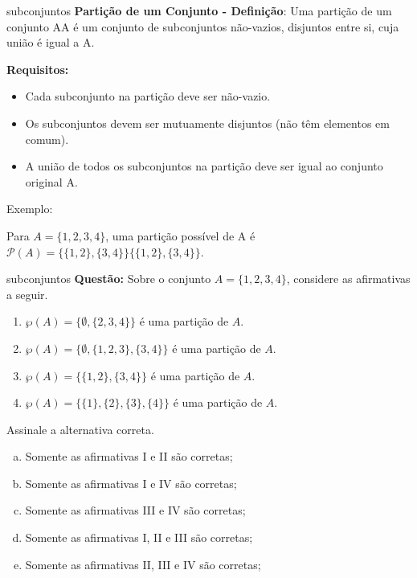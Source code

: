 \documentclass[aspectratio=169]{beamer}
\begin{document}
\begin{frame}{subconjuntos}
    \textbf{Partição de um Conjunto - Definição}: Uma partição de um conjunto AA é um conjunto de subconjuntos não-vazios, disjuntos entre si, cuja união é igual a A.
    
    \vspace{4mm}
    \textbf{Requisitos:}

    \begin{itemize}
        \item Cada subconjunto na partição deve ser não-vazio.
        \item Os subconjuntos devem ser mutuamente disjuntos (não têm elementos em comum).
        \item A união de todos os subconjuntos na partição deve ser igual ao conjunto original A.
    \end{itemize}
    
    \vspace{4mm}
    Exemplo: 

    \vspace{2mm}

    Para $A=\{1,2,3,4\}$, uma partição possível de A é $\mathcal{P}(A) = \{\{1,2\},\{3,4\}\}\{\{1,2\},\{3,4\}\}$.
        
\end{frame}

\begin{frame}{subconjuntos}
    \textbf{Questão: }
    \noindent
Sobre o conjunto $A = \{1, 2, 3, 4\}$, considere as afirmativas a seguir.

\begin{enumerate}
    \item $\wp(A) = \{\emptyset, \{2, 3, 4\}\}$ é uma partição de $A$.
    \item $\wp(A) = \{\emptyset, \{1, 2, 3\}, \{3, 4\}\}$ é uma partição de $A$.
    \item $\wp(A) = \{\{1, 2\}, \{3, 4\}\}$ é uma partição de $A$.
    \item $\wp(A) = \{\{1\}, \{2\}, \{3\}, \{4\}\}$ é uma partição de $A$.
\end{enumerate}

\noindent
Assinale a alternativa correta.

\begin{enumerate}[a)]
    \item Somente as afirmativas I e II são corretas;
    \item Somente as afirmativas I e IV são corretas;
    \item Somente as afirmativas III e IV são corretas;
    \item Somente as afirmativas I, II e III são corretas;
    \item Somente as afirmativas II, III e IV são corretas;
\end{enumerate}
\end{frame}
\end{document}
